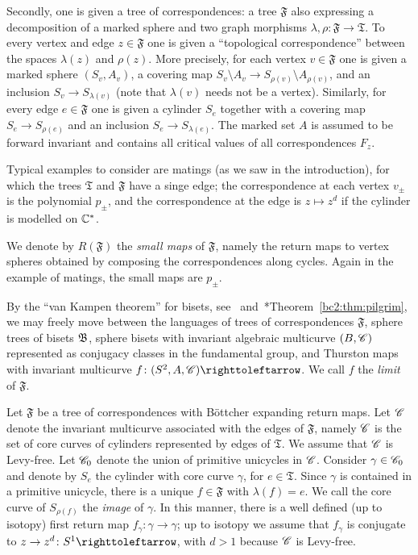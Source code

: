 \documentclass{amsart}
\begin{document}
Secondly, one is given a tree of correspondences: a tree $\mathfrak F$
also expressing a decomposition of a marked sphere and two graph
morphisms $\lambda,\rho\colon\mathfrak F\to\mathfrak T$. To every
vertex and edge $z\in\mathfrak F$ one is given a ``topological
correspondence'' between the spaces $\lambda(z)$ and $\rho(z)$. More
precisely, for each vertex $v\in \mathfrak F$ one is given a marked
sphere $(S_v,A_v)$, a covering map
$S_v\setminus A_v \to S_{\rho(v)}\setminus A_{\rho(v)}$, and an
inclusion $S_v\to S_{\lambda(v)}$ (note that $\lambda(v)$ needs not be
a vertex). Similarly, for every edge $e\in \mathfrak F$ one is given a
cylinder $S_e$ together with a covering map $S_e\to S_{\rho(e)}$ and
an inclusion $S_e\to S_{\lambda(e)}$.  The marked set $A$ is assumed
to be forward invariant and contains all critical values of all
correspondences $F_z$.

Typical examples to consider are matings (as we saw in the
introduction), for which the trees $\mathfrak T$ and $\mathfrak F$
have a singe edge; the correspondence at each vertex $v_\pm$ is the
polynomial $p_\pm$, and the correspondence at the edge is
$z\mapsto z^d$ if the cylinder is modelled on ${\mathbb C}^*$.

We denote by $R(\mathfrak F)$ the \emph{small maps} of $\mathfrak F$,
namely the return maps to vertex spheres obtained by composing the
correspondences along cycles. Again in the example of matings,
the small maps are $p_\pm$.

By the ``van Kampen theorem'' for bisets,
see~\cite{bartholdi-dudko:bc1}
and~\cite{bartholdi-dudko:bc2}*{Theorem~\ref{bc2:thm:pilgrim}}, we may
freely move between the languages of trees of correspondences
$\mathfrak F$, sphere trees of bisets ${\mathfrak B}$, sphere bisets with
invariant algebraic multicurve $(B,{\mathscr C})$ represented as conjugacy
classes in the fundamental group, and Thurston maps with invariant
multicurve $f\colon(S^2,A,\CC)\selfmap$. We call $f$ the \emph{limit}
of $\mathfrak F$.

Let $\mathfrak F$ be a tree of correspondences with B\"ottcher
expanding return maps. Let ${\mathscr C}$ denote the invariant multicurve
associated with the edges of $\mathfrak F$, namely ${\mathscr C}$ is the set of
core curves of cylinders represented by edges of $\mathfrak T$. We
assume that ${\mathscr C}$ is Levy-free. Let ${\mathscr C}_0$ denote the union of
primitive unicycles in ${\mathscr C}$. Consider $\gamma\in {\mathscr C}_0$ and denote by
$S_e$ the cylinder with core curve $\gamma$, for $e\in \mathfrak
T$. Since $\gamma$ is contained in a primitive unicycle, there is a
unique $f\in \mathfrak F$ with $\lambda(f)=e$. We call the core curve
of $S_{\rho (f)}$ the \emph{image} of $\gamma$. In this manner, there
is a well defined (up to isotopy) first return map
$f_\gamma\colon \gamma\to \gamma$; up to isotopy we assume that
$f_\gamma$ is conjugate to $z\to z^d\colon S^1\selfmap$, with $d>1$
because ${\mathscr C}$ is Levy-free.
\end{document}
